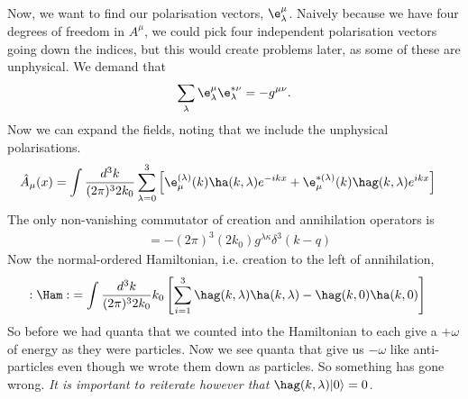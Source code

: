 \documentclass[a4paper, 11pt, normalem]{report}
\begin{document}
Now, we want to find our polarisation vectors, $\e^\mu_\lambda$.
Naively because we have four degrees of freedom in $A^\mu$, we could pick four independent polarisation vectors going down the indices, but this would create problems later, as some of these are unphysical.
We demand that
\begin{align}
    \sum_\lambda \e_\lambda^\mu \e^{*\nu}_\lambda = -g^{\mu\nu}.
\end{align}
Now we can expand the fields, noting that we include the unphysical polarisations.
\begin{align}
    \hat{A}_\mu(x) &= \int \frac{d^3k}{(2\pi)^32k_0} \sum_{\lambda=0}^3 \left[\e_{\mu}^{(\lambda)}(k)\ha(k,\lambda)e^{-ikx} + \e_{\mu}^{*(\lambda)}(k)\hag(k,\lambda)e^{ikx}\right]
\end{align}
The only non-vanishing commutator of creation and annihilation operators is
\begin{align}
    [\ha(k,\lambda),\hag(q,\kappa)] &= -(2\pi)^3(2k_0)g^{\lambda\kappa}\delta^3(k-q)
\end{align}
Now the normal-ordered Hamiltonian, i.e. creation to the left of annihilation,
\begin{align}
    :\Ham: &= \int \frac{d^3k}{(2\pi)^32k_0} k_0\left[\sum_{i=1}^3 \hag(k,\lambda)\ha(k,\lambda) - \hag(k,0)\ha(k,0)\right]
\end{align}
So before we had quanta that we counted into the Hamiltonian to each give a $+\omega$ of energy as they were particles.
Now we see quanta that give us $-\omega$ like anti-particles even though we wrote them down as particles.
So something has gone wrong.
\textit{It is important to reiterate however that $\hag(k,\lambda)|0\rangle = 0$.}
\end{document}
